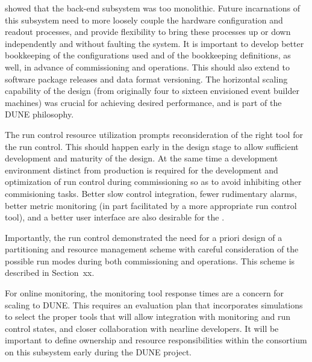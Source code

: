  showed that the back-end subsystem was %
too monolithic. Future incarnations of
this subsystem need to more loosely couple the hardware configuration
and readout processes, and provide  %
flexibility to bring these processes up or down 
independently and without faulting the system. It is important to develop better bookkeeping of 
the configurations used and of the bookkeeping definitions, %
as well, in advance of %
commissioning and operations. This should also
extend to software package releases and data format versioning. The horizontal
scaling capability of the design (from originally four to sixteen envisioned event
builder machines) was crucial for achieving desired performance, and 
is part of the DUNE  philosophy.

The  run control resource utilization
prompts reconsideration of the right tool for the   run control. This should happen early in
the design stage to allow sufficient development and maturity of the
design. At the same time a development environment %
distinct from production is required for the %
development and optimization of run control during commissioning %
so as to avoid inhibiting other commisioning tasks. Better slow
control integration, %
fewer rudimentary alarms, %
better
metric monitoring (in part facilitated by a more appropriate run
control tool), and a better user interface %
are also %
desirable for the . %

Importantly, the  run control demonstrated the need for a priori design of a 
partitioning and resource management scheme with careful
consideration of the possible run modes during both commissioning and operations. This scheme is described in Section~xx.

For online monitoring, the monitoring tool response times are a
concern for scaling to DUNE. %
This requires an evaluation plan that incorporates simulations to select the proper tools that will allow
integration with  monitoring and run control
states,  and closer collaboration with nearline developers. It will be
important to define ownership and resource responsibilities within the
 consortium on this
subsystem early during the DUNE project.

